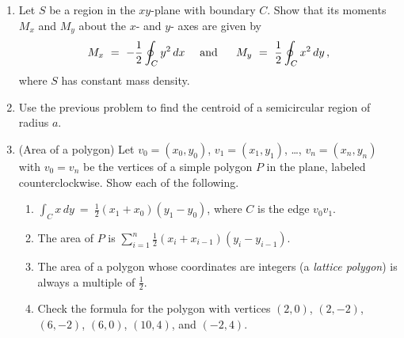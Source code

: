 \documentclass[12pt]{article}
\begin{document}
\begin{enumerate}
   
\item  Let $S$ be a region in the $xy$-plane with boundary $C$.
  Show that its moments $M_x$ and $M_y$ about the $x$- and $y$- axes are given by
  \[
  M_x\ =\ -\frac{1}{2}\oint_C y^2\, dx\quad \mbox{ and }\
  \quad
  M_y\ =\  \frac{1}{2}\oint_C x^2\, dy\,, \vspace{-2pt}
  \]
  where $S$ has constant mass density.
 \vspace{-2pt}

   
\item Use the previous problem to find the centroid of a semicircular region of radius $a$.

  
  
\item (Area of a polygon)
    Let $v_0=(x_0,y_0)$, $v_1=(x_1,y_1)$, \ldots, $v_n=(x_n,y_n)$ with $v_0=v_n$ be the vertices of a simple polygon $P$ in the plane,
    labeled counterclockwise.
    Show each of the following.
    \begin{enumerate}
    \item ${\displaystyle \int_C x\,dy\ =\ \frac{1}{2}}(x_1+x_0)(y_1-y_0)$, where $C$ is the edge $v_0 v_1$.

    \item The area of $P$ is ${\displaystyle \sum_{i=1}^n \frac{1}{2}(x_i+x_{i-1})(y_i-y_{i-1})  }$.

    \item The area of a polygon whose coordinates are integers (a {\color{blue}\sl lattice polygon}) is always a multiple of $\frac{1}{2}$.

    \item Check the formula for the polygon with vertices $(2,0)$, $(2,-2)$, $(6,-2)$, $(6,0)$, $(10,4)$, and $(-2,4)$.  \vspace{-2pt}
      
    \end{enumerate}

     



    
\end{enumerate}
\end{document}
